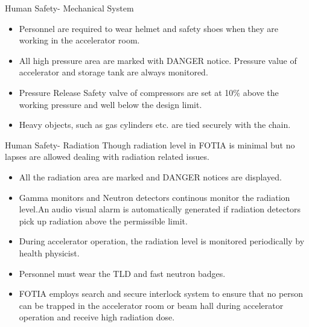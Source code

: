 \documentclass[11pt]{beamer}
\begin{document}
\begin{frame}{Human Safety- Mechanical System}

 \begin{itemize} 
 \item Personnel are required to wear helmet and safety shoes when they are working in the accelerator room.
 \item All high pressure area are marked with DANGER notice. Pressure value of accelerator and storage tank are always monitored.
 \item Pressure  Release Safety valve of compressors are set at 10\% above the working pressure and well below the design limit.
 \item Heavy objects, such as gas cylinders etc. are tied securely with the chain. 
\end{itemize}		
	 
\end{frame}



\begin{frame}{Human Safety- Radiation}
Though radiation level in FOTIA is minimal but no lapses are allowed dealing with radiation related issues.
\begin{itemize} 
 \item All the radiation area are marked and DANGER notices are  displayed.
 \item Gamma monitors and Neutron detectors continous monitor the radiation level.An audio visual alarm is automatically generated if radiation detectors pick up radiation above the permissible limit.
 \item During accelerator operation, the radiation level is monitored periodically by health physicist. 
 \item Personnel must wear the TLD and fast neutron badges.
 
 \item FOTIA employs search and secure interlock system to ensure that no person can be trapped in the accelerator room or beam hall during accelerator operation and receive high radiation dose. 
\end{itemize}		
	 
 
\end{frame}
\end{document}
